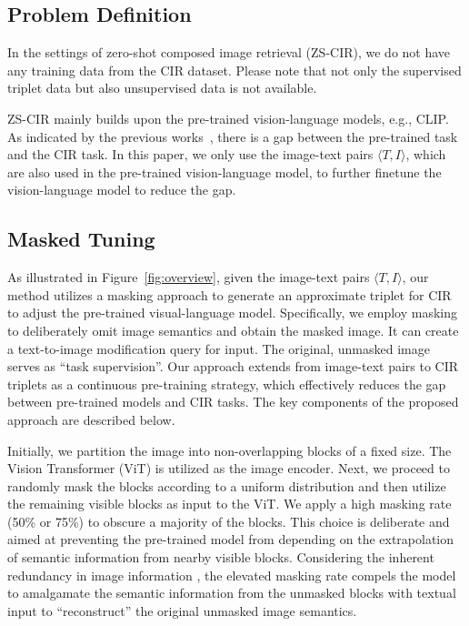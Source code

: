 \documentclass[10pt,twocolumn,letterpaper]{article}
\begin{document}
\subsection{Problem Definition}
In the settings of zero-shot composed image retrieval (ZS-CIR), we do not have any training data from the CIR dataset. Please note that not only the supervised triplet data but also unsupervised data is not available. 

ZS-CIR mainly builds upon the pre-trained vision-language models, e.g., CLIP. As indicated by the previous works~\cite{saito2023pic2word,Baldrati_2023_ICCV}, there is a gap between the pre-trained task and the CIR task. In this paper, we only use the image-text pairs $\langle T, I \rangle$, which are also used in the pre-trained vision-language model, to further finetune the vision-language model to reduce the gap.

\subsection{Masked Tuning}
As illustrated in Figure~\ref{fig:overview}, given the image-text pairs $\langle T, I \rangle$, our method utilizes a masking approach to generate an approximate triplet for CIR to adjust the pre-trained visual-language model. Specifically, we employ masking to deliberately omit image semantics and obtain the masked image. It can create a text-to-image modification query for input. The original, unmasked image serves as ``task supervision''. Our approach extends from image-text pairs to CIR triplets as a continuous pre-training strategy, which effectively reduces the gap between pre-trained models and CIR tasks. The key components of the proposed approach are described below.

Initially, we partition the image into non-overlapping blocks of a fixed size. The Vision Transformer (ViT) \cite{dosovitskiy2020vit} is utilized as the image encoder. Next, we proceed to randomly mask the blocks according to a uniform distribution and then utilize the remaining visible blocks as input to the ViT. We apply a high masking rate (50\% or 75\%) to obscure a majority of the blocks. This choice is deliberate and aimed at preventing the pre-trained model from depending on the extrapolation of semantic information from nearby visible blocks. Considering the inherent redundancy in image information \cite{he2022masked, li2023scaling}, the elevated masking rate compels the model to amalgamate the semantic information from the unmasked blocks with textual input to ``reconstruct'' the original unmasked image semantics.
\end{document}
